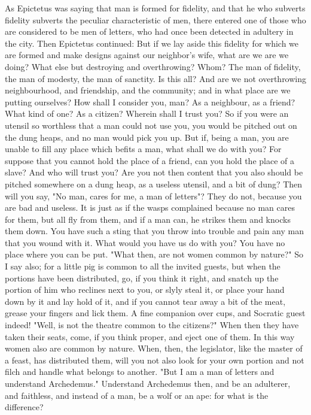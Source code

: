 \documentclass[a4paper]{article}
\begin{document}
    As Epictetus was saying that man is formed for fidelity, and that he who
subverts fidelity subverts the peculiar characteristic of men, there entered
one of those who are considered to be men of letters, who had once been
detected in adultery in the city. Then Epictetus continued: But if we lay aside
this fidelity for which we are formed and make designs against our neighbor's
wife, what are we are we doing? What else but destroying and overthrowing?
Whom? The man of fidelity, the man of modesty, the man of sanctity. Is this
all? And are we not overthrowing neighbourhood, and friendship, and the
community; and in what place are we putting ourselves? How shall I consider
you, man? As a neighbour, as a friend? What kind of one? As a citizen? Wherein
shall I trust you? So if you were an utensil so worthless that a man could not
use you, you would be pitched out on the dung heaps, and no man would pick you
up. But if, being a man, you are unable to fill any place which befits a man,
what shall we do with you? For suppose that you cannot hold the place of a
friend, can you hold the place of a slave? And who will trust you? Are you not
then content that you also should be pitched somewhere on a dung heap, as a
useless utensil, and a bit of dung? Then will you say, "No man, cares for me, a
man of letters"? They do not, because you are bad and useless. It is just as if
the wasps complained because no man cares for them, but all fly from them, and
if a man can, he strikes them and knocks them down. You have such a sting that
you throw into trouble and pain any man that you wound with it. What would you
have us do with you? You have no place where you can be put.
    "What then, are not women common by nature?" So I say also; for a little
pig is common to all the invited guests, but when the portions have been
distributed, go, if you think it right, and snatch up the portion of him who
reclines next to you, or slyly steal it, or place your hand down by it and lay
hold of it, and if you cannot tear away a bit of the meat, grease your fingers
and lick them. A fine companion over cups, and Socratic guest indeed! "Well, is
not the theatre common to the citizens?" When then they have taken their seats,
come, if you think proper, and eject one of them. In this way women also are
common by nature. When, then, the legislator, like the master of a feast, has
distributed them, will you not also look for your own portion and not filch and
handle what belongs to another. "But I am a man of letters and understand
Archedemus." Understand Archedemus then, and be an adulterer, and faithless,
and instead of a man, be a wolf or an ape: for what is the difference?
\end{document}
